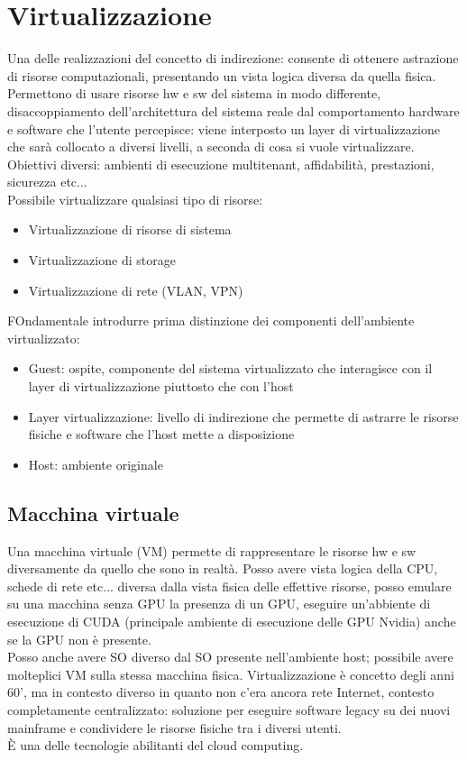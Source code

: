 \documentclass[16px]{article}
\begin{document}
\section{Virtualizzazione}
Una delle realizzazioni del concetto di indirezione: consente di ottenere astrazione di risorse computazionali, presentando un vista logica diversa da quella fisica. Permettono di usare risorse hw e sw del sistema in modo differente, disaccoppiamento dell'architettura del sistema reale dal comportamento hardware e software che l'utente percepisce: viene interposto un layer di virtualizzazione che sarà collocato a diversi livelli, a seconda di cosa si vuole virtualizzare. Obiettivi diversi: ambienti di esecuzione multitenant, affidabilità, prestazioni, sicurezza etc...\\ Possibile virtualizzare qualsiasi tipo di risorse:
\begin{itemize}
\item Virtualizzazione di risorse di sistema
\item Virtualizzazione di storage
\item Virtualizzazione di rete (VLAN, VPN)
\end{itemize}
FOndamentale introdurre prima distinzione dei componenti dell'ambiente virtualizzato:
\begin{itemize}
\item Guest: ospite, componente del sistema virtualizzato che interagisce con il layer di virtualizzazione piuttosto che con l'host
\item Layer virtualizzazione: livello di indirezione che permette di astrarre le risorse fisiche e software che l'host mette a disposizione
\item Host: ambiente originale
\end{itemize}
\subsection{Macchina virtuale}
Una macchina virtuale (VM) permette di rappresentare le risorse hw e sw diversamente da quello che sono in realtà. Posso avere vista logica della CPU, schede di rete etc... diversa dalla vista fisica delle effettive risorse, posso emulare su una macchina senza GPU la presenza di un GPU, eseguire un'abbiente di esecuzione di CUDA (principale ambiente di esecuzione delle GPU Nvidia) anche se la GPU non è presente.\\ Posso anche avere SO diverso dal SO presente nell'ambiente host; possibile avere molteplici VM sulla stessa macchina fisica. Virtualizzazione è concetto degli anni 60', ma in contesto diverso in quanto non c'era ancora rete Internet, contesto completamente centralizzato: soluzione per eseguire software legacy su dei nuovi mainframe e condividere le risorse fisiche tra i diversi utenti.\\ È una delle tecnologie abilitanti del cloud computing. 
\end{document}
